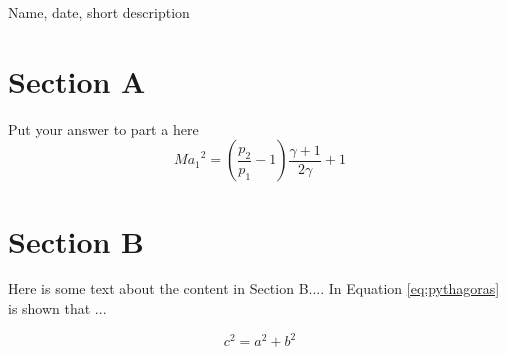 \documentclass{article}
\begin{document}
Name, date, short description

\section*{Section A}

Put your answer to part a here
\begin{equation} \label{eq:Mach}
\mathit{Ma_1}^2 = \left( \frac{p_2}{p_1} - 1 \right) 
	\frac{\gamma + 1}{2 \gamma} + 1
	\end{equation}


\section*{Section B}
Here is some text about the content in Section B....
In Equation \eqref{eq:pythagoras} is shown that ...

\begin{equation} \label{eq:pythagoras}
	c^2 = a^2 + b^2
\end{equation}
\end{document}
